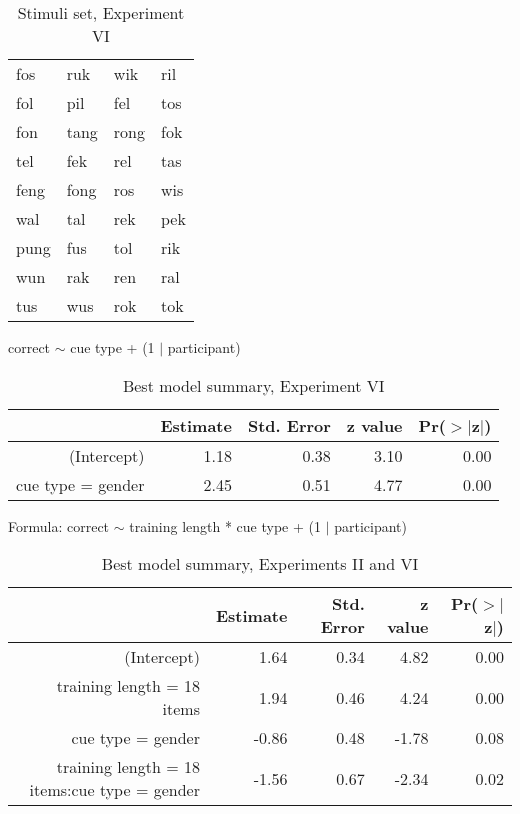\documentclass{frontiersSCNS} %
\begin{document}
\vspace{1cm}


\begin{table}[ht]
\begin{center}
\begin{tabular}{llll}
\hline
fos & ruk & wik & ril \\
 fol & pil & fel & tos \\ fon & tang & rong & fok \\
  tel & fek & rel & tas \\ feng & fong & ros & wis \\
   wal & tal & rek & pek \\ pung & fus & 
tol & rik \\ wun & rak & ren & ral \\ tus & wus & rok & tok \\
\hline

\end{tabular}
\end{center}
\caption{ \large Stimuli set, Experiment VI}
\label{exp6stimtable}
\end{table}

\vspace{1cm}

\begin{table}[h]
correct $\sim{}$ cue type + (1 $|$ participant)\\
\centering
\begin{tabular}{rrrrr}
  \hline
 & Estimate & Std. Error & z value & Pr($>$$|$z$|$) \\ 
  \hline
(Intercept) & 1.18 & 0.38 & 3.10 & 0.00 \\ 
  cue type = gender & 2.45 & 0.51 & 4.77 & 0.00 \\ 
   \hline
\end{tabular}
\caption{ \large  Best model summary, Experiment VI}
\label{exp6model}
\end{table}

\vspace{1cm}

\begin{table}[ht]
Formula: correct $\sim{}$ training length * cue type + (1 $|$ participant)\\
\centering
\begin{tabular}{rrrrr}
  \hline
 & Estimate & Std. Error & z value & Pr($>$$|$z$|$) \\ 
  \hline
(Intercept) & 1.64 & 0.34 & 4.82 & 0.00 \\ 
  training length = 18 items & 1.94 & 0.46 & 4.24 & 0.00 \\ 
  cue type = gender & -0.86 & 0.48 & -1.78 & 0.08 \\ 
  training length = 18 items:cue type = gender & -1.56 & 0.67 & -2.34 & 0.02 \\ 
   \hline
\end{tabular}
\caption{ \large  Best model summary, Experiments II and VI}
\label{exp62model}
\end{table}
\end{document}
